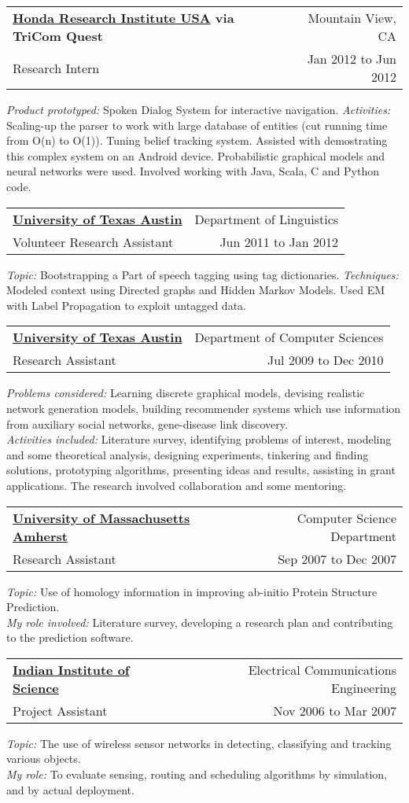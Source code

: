 \documentclass[biblist]{article}
\makeatletter
\newcommand{\resheading}[4]{
\begin{tabular*}{\columnwidth}{@{}l@{\extracolsep{\fill}}r@{}}
\textbf{#1} & #2 \\
#3 & #4 \\
\end{tabular*}}
\makeatother
\begin{document}
\resheading{\href{http://www.honda-ri.com/HRI_Us/}{Honda Research Institute USA} via TriCom Quest}
{Mountain View, CA}
{Research Intern}
{Jan 2012 to Jun 2012}
\textit{Product prototyped:} Spoken Dialog System for interactive navigation.
\textit{Activities:} Scaling-up the parser to work with large database of entities (cut running time from O(n) to O(1)).
Tuning belief tracking system. Assisted with demostrating this complex system on an Android device. Probabilistic graphical models and neural networks were used. Involved working with Java, Scala, C and Python code.

\resheading{\href{http://www.cs.utexas.edu}{University of Texas Austin}}
{Department of Linguistics}
{Volunteer Research Assistant}
{Jun 2011 to Jan 2012}
\textit{Topic:} Bootstrapping a Part of speech tagging using tag dictionaries.
\textit{Techniques:} Modeled context using Directed graphs and Hidden Markov Models. Used EM with Label Propagation to exploit untagged data.

\resheading{\href{http://www.cs.utexas.edu}{University of Texas Austin}}
{Department of Computer Sciences}
{Research Assistant}
{Jul 2009 to Dec 2010}
\textit{Problems considered:} Learning discrete graphical models, devising realistic network generation models, building recommender systems which use information from auxiliary social networks, gene-disease link discovery. \\
\textit{Activities included:} Literature survey, identifying problems of interest, modeling and some theoretical analysis, designing experiments, tinkering and finding solutions, prototyping algorithms, presenting ideas and results, assisting in grant applications. The research involved collaboration and some mentoring.



\resheading{\href{http://cs.umass.edu}{University of Massachusetts Amherst}}
{Computer Science Department}
{Research Assistant}
{Sep 2007 to Dec 2007}
\textit{Topic:} Use of homology information in improving ab-initio Protein Structure Prediction. \\
\textit{My role involved:} Literature survey, developing a research plan and contributing to the prediction software.


\resheading{\href{http://ece.iisc.ernet.in}{Indian Institute of Science}}
{Electrical Communications Engineering}
{Project Assistant}
{Nov 2006 to Mar 2007}
\textit{Topic:} The use of wireless sensor networks in detecting, classifying and tracking various objects. \\
\textit{My role:} To evaluate sensing, routing and scheduling algorithms by simulation, and by actual deployment.
\end{document}

